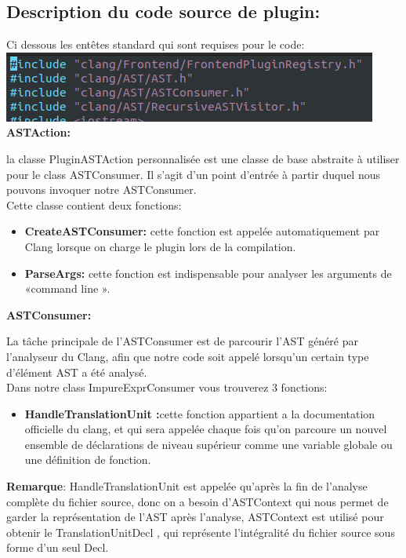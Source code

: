 \documentclass[12pt,titlepage]{article}
\begin{document}
\subsection{Description du code source de plugin:} 

Ci dessous les entêtes standard qui sont requises pour le code: \\
\includegraphics[scale=0.8]{Bibliotheques.png}
\\
\textbf{ASTAction:}

la classe PluginASTAction personnalisée est une classe de base abstraite à utiliser pour  le class ASTConsumer. Il s’agit d’un point d'entrée à partir duquel nous pouvons invoquer notre ASTConsumer.\\
Cette classe contient deux fonctions:

\begin{itemize}
    \item \textbf{CreateASTConsumer:} cette fonction est appelée automatiquement par Clang  lorsque  on charge le plugin lors de la compilation.
	\item \textbf{ ParseArgs:} cette fonction est indispensable pour analyser les arguments de «command line ».
\end{itemize}

\textbf{ASTConsumer:} 

La tâche principale de l’ASTConsumer est de parcourir  l'AST généré par l'analyseur du Clang, afin que notre code soit appelé lorsqu'un certain type d'élément AST a été analysé.\\
Dans notre class ImpureExprConsumer vous trouverez 3 fonctions:

\begin{itemize}
    \item \textbf{HandleTranslationUnit :}cette fonction appartient a la documentation officielle du clang, et qui sera appelée chaque fois qu’on parcoure un nouvel ensemble de déclarations de niveau supérieur comme une variable globale ou une  définition de fonction.
\end{itemize}

\textbf{Remarque}: HandleTranslationUnit est appelée qu'après la fin de l’analyse complète du fichier source, donc on a besoin d’ASTContext qui nous permet de garder la représentation de l’AST après l’analyse, ASTContext  est utilisé pour obtenir le TranslationUnitDecl , qui représente l'intégralité du fichier source sous forme d’un seul Decl. \\
\end{document}
